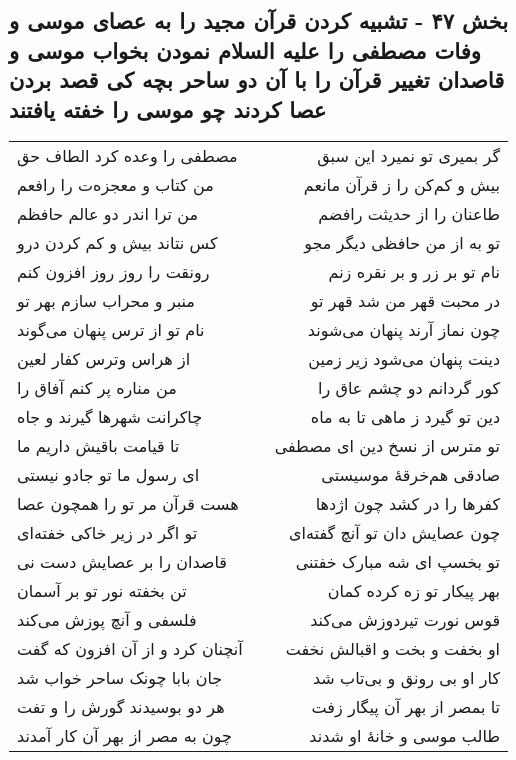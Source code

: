 \begin{center}
\section*{بخش ۴۷ - تشبیه کردن قرآن مجید را به عصای موسی و وفات مصطفی را علیه السلام نمودن بخواب موسی و قاصدان تغییر قرآن را با آن دو ساحر بچه کی قصد بردن عصا کردند چو موسی  را خفته یافتند}
\label{sec:sh047}
\begin{longtable}{l p{0.5cm} r}
مصطفی را وعده کرد الطاف حق
&&
گر بمیری تو نمیرد این سبق
\\
من کتاب و معجزه‌ت را رافعم
&&
بیش و کم‌کن را ز قرآن مانعم
\\
من ترا اندر دو عالم حافظم
&&
طاعنان را از حدیثت رافضم
\\
کس نتاند بیش و کم کردن درو
&&
تو به از من حافظی دیگر مجو
\\
رونقت را روز روز افزون کنم
&&
نام تو بر زر و بر نقره زنم
\\
منبر و محراب سازم بهر تو
&&
در محبت قهر من شد قهر تو
\\
نام تو از ترس پنهان می‌گوند
&&
چون نماز آرند پنهان می‌شوند
\\
از هراس وترس کفار لعین
&&
دینت پنهان می‌شود زیر زمین
\\
من مناره پر کنم آفاق را
&&
کور گردانم دو چشم عاق را
\\
چاکرانت شهرها گیرند و جاه
&&
دین تو گیرد ز ماهی تا به ماه
\\
تا قیامت باقیش داریم ما
&&
تو مترس از نسخ دین ای مصطفی
\\
ای رسول ما تو جادو نیستی
&&
صادقی هم‌خرقهٔ موسیستی
\\
هست قرآن مر تو را همچون عصا
&&
کفرها را در کشد چون اژدها
\\
تو اگر در زیر خاکی خفته‌ای
&&
چون عصایش دان تو آنچ گفته‌ای
\\
قاصدان را بر عصایش دست نی
&&
تو بخسپ ای شه مبارک خفتنی
\\
تن بخفته نور تو بر آسمان
&&
بهر پیکار تو زه کرده کمان
\\
فلسفی و آنچ پوزش می‌کند
&&
قوس نورت تیردوزش می‌کند
\\
آنچنان کرد و از آن افزون که گفت
&&
او بخفت و بخت و اقبالش نخفت
\\
جان بابا چونک ساحر خواب شد
&&
کار او بی رونق و بی‌تاب شد
\\
هر دو بوسیدند گورش را و تفت
&&
تا بمصر از بهر آن پیگار زفت
\\
چون به مصر از بهر آن کار آمدند
&&
طالب موسی و خانهٔ او شدند
\\

\end{longtable}
\end{center}

